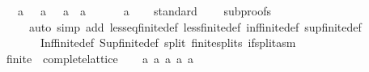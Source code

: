 \begin{isabellebody}
\ \ \ {\isacharbar}{\kern0pt}\ {\isacharparenleft}{\kern0pt}a\ {\isacharunderscore}{\kern0pt}{\isacharparenright}{\kern0pt}\ {\isasymRightarrow}\ a\ {\isacharbar}{\kern0pt}\ {\isacharparenleft}{\kern0pt}{\isacharunderscore}{\kern0pt}{\isacharcomma}{\kern0pt}\ a\ {\isasymRightarrow}\ a\isanewline
\ \ \ {\isacharbar}{\kern0pt}\ {\isacharunderscore}{\kern0pt}\ {\isasymRightarrow}\ a\isanewline
\isanewline
{}\isamarkupfalse%
\isanewline
%
\isadelimproof
\ \ %
\endisadelimproof
%
\isatagproof
{}\isamarkupfalse%
\ standard\isanewline
\ \ \ \ {\isacharparenleft}{\kern0pt}subproofs\isanewline
\ \ \ \ \ \ {\isacartoucheopen}auto\ simp\ add{\isacharcolon}{\kern0pt}\ less{\isacharunderscore}{\kern0pt}eq{\isacharunderscore}{\kern0pt}finite{\isacharunderscore}{\kern0pt}{}{\isacharunderscore}{\kern0pt}def\ less{\isacharunderscore}{\kern0pt}finite{\isacharunderscore}{\kern0pt}{}{\isacharunderscore}{\kern0pt}def\ inf{\isacharunderscore}{\kern0pt}finite{\isacharunderscore}{\kern0pt}{}{\isacharunderscore}{\kern0pt}def\ sup{\isacharunderscore}{\kern0pt}finite{\isacharunderscore}{\kern0pt}{}{\isacharunderscore}{\kern0pt}def\ \isanewline
\ \ \ \ \ \ \ \ Inf{\isacharunderscore}{\kern0pt}finite{\isacharunderscore}{\kern0pt}{}{\isacharunderscore}{\kern0pt}def\ Sup{\isacharunderscore}{\kern0pt}finite{\isacharunderscore}{\kern0pt}{}{\isacharunderscore}{\kern0pt}def\ split{\isacharcolon}{\kern0pt}\ finite{\isacharunderscore}{\kern0pt}{}{\isachardot}{\kern0pt}splits\ if{\isacharunderscore}{\kern0pt}split{\isacharunderscore}{\kern0pt}asm{\isacartoucheclose}{\isacharparenright}{\kern0pt}%
\endisatagproof
{\isafoldproof}%
%
\isadelimproof
\isanewline
%
\endisadelimproof
{}\isamarkupfalse%
\isanewline
\isanewline
\isanewline
{}\isamarkupfalse%
\ \ finite{\isacharunderscore}{\kern0pt}{}\ {\isacharcolon}{\kern0pt}{\isacharcolon}{\kern0pt}\ complete{\isacharunderscore}{\kern0pt}lattice%
\isadelimproof
\ %
\endisadelimproof
%
\isatagproof
\isacommand{{\isachardot}{\kern0pt}{\isachardot}{\kern0pt}}\isamarkupfalse%
%
\endisatagproof
{\isafoldproof}%
%
\isadelimproof
%
\endisadelimproof
\isanewline
\isanewline
\isanewline
{}\isamarkupfalse%
\ {\isacharparenleft}{\kern0pt}\ a\ a\ a\ a\ a%

\end{isabellebody}
